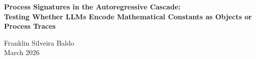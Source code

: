 \documentclass[12pt,a4paper]{article}
\begin{document}
\begin{center}
    {\LARGE\bfseries Process Signatures in the Autoregressive Cascade:\\[4pt]
    Testing Whether LLMs Encode Mathematical Constants as Objects or Process Traces\\[4pt]}

    \vspace{0.5em}
    {\large Franklin Silveira Baldo}\\
    \vspace{0.5em}
    March 2026
\end{center}

\begin{abstract}
This paper tests whether mathematical constants ($e$, $\pi$, $i$, $\sqrt{2}$) are encoded in LLM weights primarily as numerical values (metric) or as associations with process types (topology). The manifesto predicts topology is deeper than metric: the process-association ($e \leftrightarrow$ exponential growth) should be more thermally robust than the numerical value ($e \approx 2.71828$). Thermal spectroscopy across temperatures $T \in \{0.0, 0.3, 0.7, 1.0, 1.5, 2.0\}$ tests this prediction.
\end{abstract}

\end{document}
